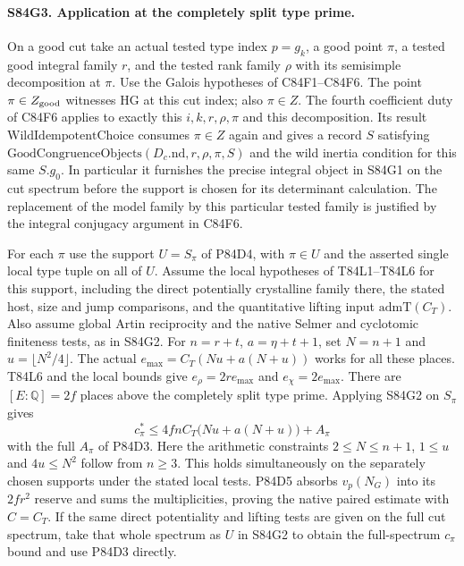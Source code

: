 \paragraph{S84G3. Application at the completely split type prime.}
On a good cut take an actual tested type index $p=g_k$, a
good point $\pi$, a tested good integral family $r$, and the
tested rank family $\rho$ with its semisimple decomposition
at $\pi$. Use the Galois hypotheses of C84F1--C84F6.
The point $\pi\in Z_{\rm good}$ witnesses
$\mathrm{HG}$ at this cut index; also $\pi\in Z$. The fourth
coefficient duty of C84F6 applies to exactly this $i,k,r,\rho,\pi$
and this decomposition. Its result
$\mathrm{WildIdempotentChoice}$ consumes $\pi\in Z$ again
and gives a record $S$ satisfying
$\mathrm{GoodCongruenceObjects}(D_{c}.\mathrm{nd},r,\rho,\pi,S)$
and the wild inertia condition for this same $S.g_0$.
In particular it furnishes the precise integral object in
S84G1 on the cut spectrum before the support is chosen for
its determinant calculation. The replacement of the model
family by this particular tested family is justified by the
integral conjugacy argument in C84F6.

For each $\pi$ use the support $U=S_\pi$ of P84D4, with
$\pi\in U$ and the asserted single local type tuple on all
of $U$. Assume the local hypotheses of T84L1--T84L6 for
this support, including the direct potentially crystalline
family there, the stated host, size and jump comparisons,
and the quantitative lifting input $\mathrm{admT}(C_T)$.
Also assume global Artin reciprocity and the native Selmer
and cyclotomic finiteness tests, as in S84G2. For $n=r+t$,
$a=\eta+t+1$, set $N=n+1$ and $u=\lfloor N^2/4\rfloor$.
The actual $e_{\max}=C_T(Nu+a(N+u))$ works for all
these places. T84L6 and the local bounds give
$e_\rho=2r e_{\max}$ and $e_\chi=2e_{\max}$. There are
$[E:\mathbb Q]=2f$ places above the completely split type
prime. Applying S84G2 on $S_\pi$ gives
\[
     c_\pi^*\le 4fn C_T\bigl(Nu+a(N+u)\bigr)+A_\pi
\]
with the full $A_\pi$ of P84D3. Here the arithmetic constraints
$2\le N\le n+1$, $1\le u$ and $4u\le N^2$ follow from
$n\ge3$. This holds simultaneously on the separately chosen
supports under the stated local tests. P84D5 absorbs
$v_p(N_G)$ into its $2fr^2$ reserve and sums the
multiplicities, proving the native paired estimate with
$C=C_T$. If the same direct potentiality and lifting tests
are given on the full cut spectrum, take that whole spectrum
as $U$ in S84G2 to obtain the full-spectrum $c_\pi$ bound
and use P84D3 directly.
